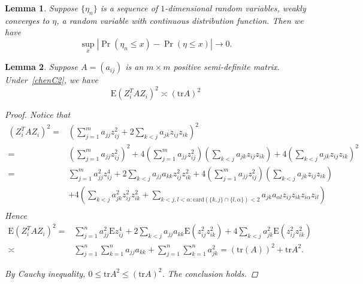 \documentclass[review]{elsarticle}
\theoremstyle{plain}
\newtheorem{lemma}{Lemma}
\theoremstyle{definition}
\theoremstyle{remark}
\begin{document}
\begin{lemma}\label{lemmaUniformSimple}
    Suppose $\{\eta_n\}$ is a sequence of $1$-dimensional random variables, weakly converges to $\eta$, a random variable with continuous distribution function.
    Then we have
    $$
    \sup_{x}|\Pr(\eta_n\leq x)-\Pr(\eta\leq x)|\to 0.
    $$
\end{lemma}

\begin{lemma}\label{lemmaQ}
    Suppose $A=(a_{ij})$ is an $m\times m$ positive semi-definite matrix. Under~\eqref{chenC2}, we have
        $$
        \mathrm{E} {(Z_i^T A Z_i)}^2\asymp {(\mathrm{tr}A)}^2
        $$
\begin{proof}
Notice that
    $$
    \begin{aligned}
        {(Z_i^T A Z_i)}^2
        =&
        (\sum_{j=1}^m a_{jj}z_{ij}^2+2\sum_{k<j}a_{jk}z_{ij}z_{ik})^2\\
        =&
        (\sum_{j=1}^m a_{jj}z_{ij}^2)^2+
        4(\sum_{j=1}^m a_{jj}z_{ij}^2)(\sum_{k<j}a_{jk}z_{ij}z_{ik})+
        4(\sum_{k<j}a_{jk}z_{ij}z_{ik})^2\\
        =&
        \sum_{j=1}^m a_{jj}^2z_{ij}^4+2\sum_{k<j}a_{jj}a_{kk}z_{ij}^2 z_{ik}^2+
        4(\sum_{j=1}^m a_{jj}z_{ij}^2)(\sum_{k<j}a_{jk}z_{ij}z_{ik})\\
        &+
        4(\sum_{k<j}a_{jk}^2z_{ij}^2z_{ik}^2+\sum_{k<j,l<\alpha:\mathrm{card}(\{k,j\}\cap\{l,\alpha\})<2} a_{jk}a_{\alpha l}z_{ij}z_{ik}z_{i\alpha}z_{il})\\
    \end{aligned}
    $$
Hence
    $$
    \begin{aligned}
        \mathrm{E}{(Z_i^T A Z_i)}^2
        =&
        \sum_{j=1}^n a_{jj}^2 \mathrm{E}z_{ij}^4+2\sum_{k<j}a_{jj}a_{kk}\mathrm{E}(z_{ij}^2 z_{ik}^2)+
        4\sum_{k<j}a_{jk}^2 \mathrm{E}(z_{ij}^2z_{ik}^2)\\
        \asymp &
        \sum_{j=1}^n\sum_{k=1}^n a_{jj}a_{kk}+
        \sum_{j=1}^n\sum_{k=1}^n a_{jk}^2
        ={(\mathrm{tr}(A))}^2+\mathrm{tr}A^2.
    \end{aligned}
    $$

    By Cauchy inequality, $0\leq \mathrm{tr} A^2\leq {(\mathrm{tr}A)}^2$. The conclusion holds.

\end{proof}
\end{lemma}
\end{document}
